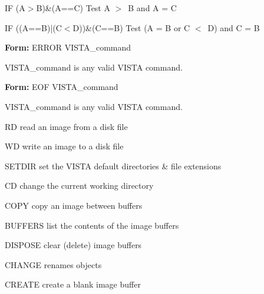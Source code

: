 {\newpage\clearpage
{}%
\begin{example}
  \item[IF (A$>$B)\&(A==C)\hfill]{Test A $>$\  B and A = C}
  \item[IF ((A==B)|(C$<$D))\&(C==B)\hfill]{Test (A = B or C $<$\  D) and C = B}
\end{example}%
\lthtmlfigureZ
\lthtmlcheckvsize\clearpage}

{\newpage\clearpage
{}%
\begin{command}
  \item[\textbf{Form: } ERROR  VISTA\_command\hfill]{}
  \item[VISTA\_command]{is any valid VISTA command.}
\end{command}%
\lthtmlfigureZ
\lthtmlcheckvsize\clearpage}

{\newpage\clearpage
{}%
\begin{command}
  \item[\textbf{Form: } EOF  VISTA\_command\hfill]{}
  \item[VISTA\_command]{is any valid VISTA command.}
\end{command}%
\lthtmlfigureZ
\lthtmlcheckvsize\clearpage}

{\newpage\clearpage
{}%
\begin{example}
  \item[RD\hfill]{read an image from a disk file}
  \item[WD\hfill]{write an image to a disk file}
\end{example}%
\lthtmlfigureZ
\lthtmlcheckvsize\clearpage}

{\newpage\clearpage
{}%
\begin{example}
   \item[SETDIR\hfill]{set the VISTA default directories \& file extensions}
   \item[CD\hfill]{change the current working directory}
\end{example}%
\lthtmlfigureZ
\lthtmlcheckvsize\clearpage}

{\newpage\clearpage
{}%
\begin{example}
  \item[COPY\hfill]{copy an image between buffers}
  \item[BUFFERS\hfill]{list the contents of the image buffers}
  \item[DISPOSE\hfill]{clear (delete) image buffers}
  \item[CHANGE\hfill]{renames objects}
  \item[CREATE\hfill]{create a blank image buffer}
\end{example}%
\lthtmlfigureZ
\lthtmlcheckvsize\clearpage}

